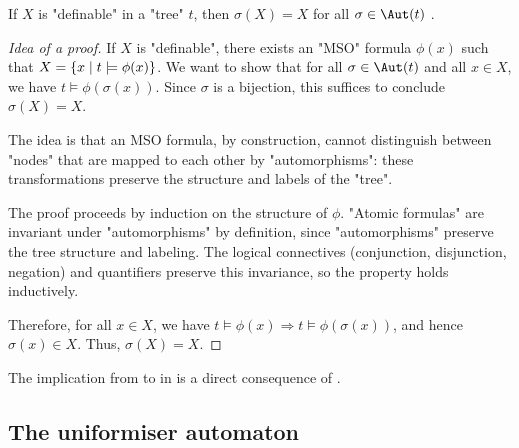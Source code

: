 \documentclass[a4paper,UKenglish,cleveref, autoref, thm-restate]{lipics-v2021}
\begin{document}
\begin{lemma}\label{lem:def-aut}
	If $X$ is "definable" in a "tree" $t$, then $\sigma(X) = X$ for all $\sigma \in \Aut(t)$ .
\end{lemma}
\begin{proof}[Idea of a proof]
	If $X$ is "definable", there exists an "MSO" formula $\phi(x)$ such that $X = \left\{x \mid t \models \phi(x)\right\}$.
	We want to show that for all $\sigma \in \Aut(t)$ and all $x \in X$, we have $t \models \phi(\sigma(x))$.
	Since $\sigma$ is a bijection, this suffices to conclude $\sigma(X) = X$.

	The idea is that an MSO formula, by construction, cannot distinguish between "nodes" that are mapped to each other by "automorphisms":
	these transformations preserve the structure and labels of the "tree".

	The proof proceeds by induction on the structure of $\phi$. "Atomic formulas" are invariant under "automorphisms" by definition,
	since "automorphisms" preserve the tree structure and labeling. The logical connectives (conjunction, disjunction, negation)
	and quantifiers preserve this invariance, so the property holds inductively.

	Therefore, for all $x \in X$, we have $t \models \phi(x) \Rightarrow t \models \phi(\sigma(x))$, and hence $\sigma(x) \in X$. Thus, $\sigma(X) = X$.
\end{proof}

The implication from  to  in  is a direct consequence of .

\subsection{The uniformiser automaton}
\end{document}
